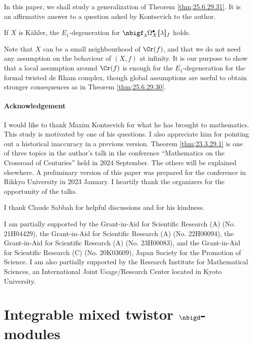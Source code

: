 \documentclass[a4,10pt]{article}
\begin{document}
In this paper,
we shall study a generalization of
Theorem \ref{thm;25.6.29.31}.
It is an affirmative answer to a question
asked by Kontsevich to the author.

\begin{thm}
\label{thm;23.3.29.1}
If $X$ is K\"ahler,
the $E_1$-degeneration 
for $\nbigf_{\lambda}\Omega_X^{\bullet}[\![\lambda]\!]_f$
holds.
\end{thm}

Note that $X$ can be a small neighbourhood of $\Cr(f)$,
and that we do not need any assumption
on the behaviour of $(X,f)$ at infinity.
It is our purpose to show that
a local assumption around $\Cr(f)$ is enough for
the $E_1$-degeneration for
the formal twisted de Rham complex,
though global assumptions are useful
to obtain stronger consequences
as in Theorem \ref{thm;25.6.29.30}.

\paragraph{Acknowledgement}

I would like to thank Maxim Kontsevich for
what he has brought to mathematics.
This study is motivated by one of his questions.
I also appreciate him for pointing out a historical inaccuracy
in a previous version.
Theorem \ref{thm;23.3.29.1}
is one of three topics
in  the author's talk in the conference
``Mathematics on the Crossroad of Centuries''
held in 2024 September.
The others will be explained elsewhere.
A preliminary version of this paper was prepared for
the conference in Rikkyo University in 2023 January.
I heartily thank the organizers for the opportunity of the talks.

I thank Claude Sabbah for helpful discussions
and for his kindness.

I am partially supported by
the Grant-in-Aid for Scientific Research (A) (No. 21H04429),
the Grant-in-Aid for Scientific Research (A) (No. 22H00094),
the Grant-in-Aid for Scientific Research (A) (No. 23H00083),
and the Grant-in-Aid for Scientific Research (C) (No. 20K03609),
Japan Society for the Promotion of Science.
I am also partially supported by the Research Institute for Mathematical
Sciences, an International Joint Usage/Research Center located in Kyoto
University.

\section{Integrable mixed twistor $\nbigd$-modules}
\end{document}
